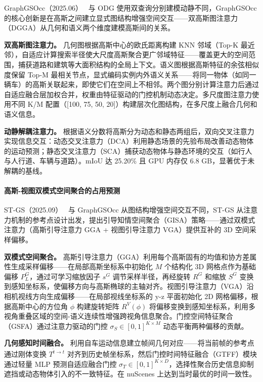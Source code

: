 GraphGSOcc（2025.06）~\cite{2506_14825} 与 ODG 使用双查询分别建模动静不同，GraphGSOcc 的核心创新是在高斯之间建立显式图结构增强空间交互——双高斯图注意力（DGGA）从几何和语义两个维度建模高斯间的关系。

\textbf{双高斯图注意力。} 几何图根据高斯中心的欧氏距离构建 KNN 邻域（Top-K 最近邻），自适应计算搜索半径使大尺度高斯聚合更广邻域特征——覆盖更大的空间范围，捕获道路和建筑等大面积结构的全局上下文。语义图根据高斯特征的余弦相似度保留 Top-M 最相关节点，显式编码实例内外语义关系——将同一物体（如同一辆车）的高斯关联起来，即使它们在空间上不相邻。两个图分别计算注意力后通过自适应融合层加权合并，权重由特征驱动的门控机制动态决定。多尺度图注意力使用不同 K/M 配置（[100, 75, 50, 20]）构建层次化图结构，在多尺度上融合几何和语义信息。

\textbf{动静解耦注意力。} 根据语义分数将高斯分为动态和静态两组后，双向交叉注意力实现信息交互：动态交叉注意力（DCA）利用静态场景的先验布局改善动态物体的运动预测；静态交叉注意力（SCA）捕获动态物体与静态环境的交互（如行人与人行道、车辆与道路）。mIoU 达 25.20\% 且 GPU 内存仅 6.8 GB，显著优于未解耦的基线。

\paragraph{高斯-视图双模式空间聚合的占用预测}

ST-GS（2025.09）~\cite{2509_16552} 与 GraphGSOcc 从图结构增强空间交互不同，ST-GS 从注意力机制的参考点设计出发，提出引导知情空间聚合（GISA）策略——通过双模式注意力（高斯引导注意力 GGA + 视图引导注意力 VGA）提供互补的 3D 空间采样偏移。

\textbf{双模式空间聚合。} 高斯引导注意力（GGA）利用每个高斯固有的均值和协方差属性生成采样偏移——在局部高斯坐标系中初始化 $M$ 个结构化 3D 网格点作为基础偏移 $P_L^G$，通过可学习缩放因子 $s^G$ 调节采样半径，再经旋转 $R^G$ 和缩放 $S^G$ 变换到感知坐标系，使偏移方向与高斯椭球的主轴对齐。视图引导注意力（VGA）沿相机视线方向生成偏移——在局部视线坐标系的 y-z 平面初始化 2D 网格偏移，根据高斯中心的方位角 $\phi$ 构建旋转矩阵 $R^V(\phi)$ 将偏移变换到感知坐标系，利用多视角重叠区域的空间-语义连续性增强跨视角信息聚合。门控空间特征聚合（GSFA）通过注意力驱动的门控 $\sigma_S \in [0,1]^{K \times M}$ 动态平衡两种偏移的贡献。

\textbf{几何感知时间融合。} 利用自车运动信息建立帧间几何对应——将当前帧的参考点通过刚体变换 $T^{\hat{t} \to t}$ 对齐到历史帧坐标系，然后门控时间特征融合（GTFF）模块通过轻量 MLP 预测自适应融合门控 $\sigma_T \in [0,1]^{K \times D}$，选择性聚合历史信息抑制遮挡或动态物体引入的不一致特征。在 nuScenes 上达到当时最优的时间一致性。

